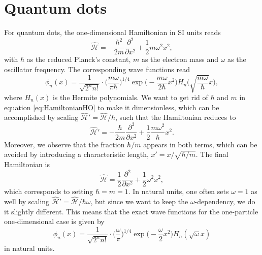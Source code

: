 \section{Quantum dots}
For quantum dots, the one-dimensional Hamiltonian in SI units reads
\begin{equation}
\hat{\mathcal{H}}=-\frac{\hbar^2}{2m}\frac{\partial^2}{\partial x^2}+\frac{1}{2}m\omega^2x^2,
\label{eq:HamiltonianHO}
\end{equation}
with $\hbar$ as the reduced Planck's constant, $m$ as the electron mass and $\omega$ as the oscillator frequency. The corresponding wave functions read
\begin{equation}
\phi_n(x)=\frac{1}{\sqrt{2^nn!}}\cdot\bigg(\frac{m\omega}{\pi\hbar}\bigg)^{1/4}\exp\Big(-\frac{m\omega}{2\hbar}x^2\Big)H_n\Big(\sqrt{\frac{m\omega}{\hbar}}x\Big),
\end{equation}
where $H_n(x)$ is the Hermite polynomials. We want to get rid of $\hbar$ and $m$ in equation \eqref{eq:HamiltonianHO} to make it dimensionless, which can be accomplished by scaling  $\hat{\mathcal{H}}'= \hat{\mathcal{H}}/\hbar$, such that the Hamiltonian reduces to
\begin{equation}
\hat{\mathcal{H}}'=-\frac{\hbar}{2m}\frac{\partial^2}{\partial x^2}+\frac{1}{2}\frac{m\omega^2}{\hbar}x^2.
\end{equation}
Moreover, we observe that the fraction $\hbar/m$ appears in both terms, which can be avoided by introducing a characteristic length, $x'= x/\sqrt{\hbar/m}$. The final Hamiltonian is
\begin{equation}
\hat{\mathcal{H}}=\frac{1}{2}\frac{\partial^2}{\partial x^2}+\frac{1}{2}\omega^2x^2,
\end{equation}
which corresponds to setting $\hbar=m=1$. In natural units, one often sets $\omega=1$ as well by scaling $\hat{\mathcal{H}}'=\hat{\mathcal{H}}/\hbar\omega$, but since we want to keep the $\omega$-dependency, we do it slightly different. This means that the exact wave functions for the one-particle one-dimensional case is given by
\begin{equation}
\phi_n(x)=\frac{1}{\sqrt{2^nn!}}\cdot\bigg(\frac{\omega}{\pi}\bigg)^{1/4}\exp\Big(-\frac{\omega}{2}x^2\Big)H_n(\sqrt{\omega}x)
\end{equation} 
in natural units.

